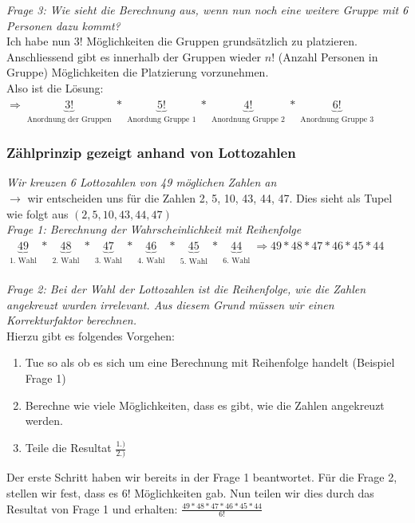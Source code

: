 \documentclass[a4paper]{article}
\theoremstyle{definition}
\theoremstyle{example}
\begin{document}
\textit{Frage 3: Wie sieht die Berechnung aus, wenn nun noch eine weitere Gruppe mit 6 Personen dazu kommt?}\\
Ich habe nun $3!$ Möglichkeiten die Gruppen grundsätzlich zu platzieren. Anschliessend gibt es innerhalb der Gruppen wieder $n!$ (Anzahl Personen in Gruppe) Möglichkeiten die Platzierung vorzunehmen.\\
Also ist die Lösung: $\Rightarrow \underbrace{3!}_{\substack{\textrm{Anordnung der Gruppen}}} * \underbrace{5!}_{\substack{\textrm{Anordung Gruppe 1}}} * \underbrace{4!}_{\substack{\textrm{Anordnung Gruppe 2}}} * \underbrace{6!}_{\substack{\textrm{Anordnung Gruppe 3}}}$

\subsubsection{Zählprinzip gezeigt anhand von Lottozahlen}
\textit{Wir kreuzen 6 Lottozahlen von 49 möglichen Zahlen an}\\
$\rightarrow$ wir entscheiden uns für die Zahlen 2, 5, 10, 43, 44, 47. Dies sieht als Tupel wie folgt aus $(2, 5, 10, 43, 44, 47)$\\
\textit{Frage 1: Berechnung der Wahrscheinlichkeit mit Reihenfolge}\\
$\underbrace{49}_{\substack{\textrm{1. Wahl}}} * \underbrace{48}_{\substack{\textrm{2. Wahl}}} * \underbrace{47}_{\substack{\textrm{3. Wahl}}} * \underbrace{46}_{\substack{\textrm{4. Wahl}}} * \underbrace{45}_{\substack{\textrm{5. Wahl}}} * \underbrace{44}_{\substack{\textrm{6. Wahl}}} \Rightarrow 49 * 48 * 47 * 46 * 45 * 44$\\\\
\textit{Frage 2: Bei der Wahl der Lottozahlen ist die Reihenfolge, wie die Zahlen angekreuzt wurden irrelevant. Aus diesem Grund müssen wir einen Korrekturfaktor berechnen.}\\
Hierzu gibt es folgendes Vorgehen:
\begin{enumerate}
\item Tue so als ob es sich um eine Berechnung mit Reihenfolge handelt (Beispiel Frage 1)
\item Berechne wie viele Möglichkeiten, dass es gibt, wie die Zahlen angekreuzt werden.
\item Teile die Resultat $\frac{1.)}{2.)} $
\end{enumerate}
Der erste Schritt haben wir bereits in der Frage 1 beantwortet. Für die Frage 2, stellen wir fest, dass es  $6!$ Möglichkeiten gab. Nun teilen wir dies durch das Resultat von Frage 1 und erhalten:
$\frac{49 * 48 * 47 * 46 * 45 * 44}{6!}$
\end{document}
